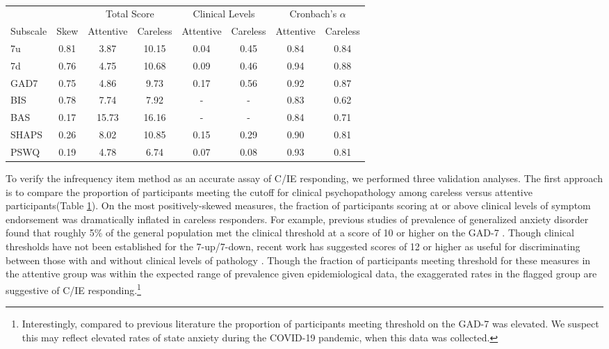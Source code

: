 \documentclass[a4paper,notitlepage,12pt]{article}
\begin{document}
\begin{table}[!t]
\centering
\setlength{\tabcolsep}{6pt}
\begin{tabular}{lccccccc}
\toprule
& & \multicolumn{2}{c}{Total Score} & \multicolumn{2}{c}{Clinical Levels} & \multicolumn{2}{c}{Cronbach's $\alpha$} \\
\cmidrule(lr){3-4} \cmidrule(lr){5-6} \cmidrule(lr){7-8}
 Subscale & Skew & Attentive & Careless & Attentive & Careless & Attentive & Careless \\
\midrule
\midrule
7u    &  0.81 &    3.87 &   10.15 &     0.04 &     0.45 &    0.84 &    0.84 \\
7d    &  0.76 &    4.75 &   10.68 &     0.09 &     0.46 &    0.94 &    0.88 \\
GAD7  &  0.75 &    4.86 &    9.73 &     0.17 &     0.56 &    0.92 &    0.87 \\
BIS   &  0.78 &    7.74 &    7.92 &        - &        - &    0.83 &    0.62 \\
BAS   &  0.17 &   15.73 &   16.16 &        - &        - &    0.84 &    0.71 \\
SHAPS &  0.26 &    8.02 &   10.85 &     0.15 &     0.29 &    0.90 &    0.81 \\
PSWQ  &  0.19 &    4.78 &    6.74 &     0.07 &     0.08 &    0.93 &    0.81 \\
\bottomrule
\end{tabular}
\caption{}
\label{tab:screening}
\end{table}

To verify the infrequency item method as an accurate assay of C/IE responding, we performed three validation analyses. The first approach is to compare the proportion of participants meeting the cutoff for clinical psychopathology among careless versus attentive participants(Table \ref{tab:screening}). On the most positively-skewed measures, the fraction of participants scoring at or above clinical levels of symptom endorsement was dramatically inflated in careless responders. For example, previous studies of prevalence of generalized anxiety disorder found that roughly 5\% of the general population met the clinical threshold at a score of 10 or higher on the GAD-7 \cite{lowe2008validation, hinz2017psychometric}. Though clinical thresholds have not been established for the 7-up/7-down, recent work has suggested scores of 12 or higher as useful for discriminating between those with and without clinical levels of pathology \cite{youngstrom2020evaluating}. Though the fraction of participants meeting threshold for these measures in the attentive group was within the expected range of prevalence given epidemiological data, the exaggerated rates in the flagged group are suggestive of C/IE responding.\footnote{Interestingly, compared to previous literature the proportion of participants meeting threshold on the GAD-7 was elevated. We suspect this may reflect elevated rates of state anxiety during the COVID-19 pandemic, when this data was collected.}
\end{document}
